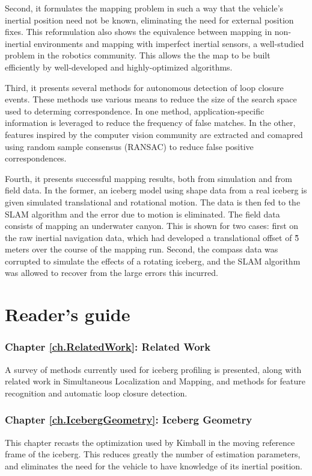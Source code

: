 Second, it formulates the mapping problem in such a way that the vehicle's inertial position need not be known, eliminating the need for external position fixes. This reformulation also shows the equivalence between mapping in non-inertial environments and mapping with imperfect inertial sensors, a well-studied problem in the robotics community. This allows the the map to be built efficiently by well-developed and highly-optimized algorithms.

Third, it presents several methods for autonomous detection of loop closure events. These methods use various means to reduce the size of the search space used to determing correspondence. In one method, application-specific information is leveraged to reduce the frequency of false matches. In the other, features inspired by the computer vision community are extracted and comapred using random sample consensus (RANSAC) to reduce  false positive correspondences.

Fourth, it presents successful mapping results, both from simulation and from field data. In the former, an iceberg model using shape data from a real iceberg is given simulated translational and rotational motion. The data is then fed to the SLAM algorithm and the error due to motion is eliminated. The field data consists of mapping an underwater canyon. This is shown for two cases: first on the raw inertial navigation data, which had developed a translational offset of \~ 5 meters over the course of the mapping run. Second, the compass data was corrupted to simulate the effects of a rotating iceberg, and the SLAM algorithm was allowed to recover from the large errors this incurred.

\section{Reader's guide}

\subsubsection*{Chapter \ref{ch.RelatedWork}: Related Work} A survey of methods currently used for iceberg profiling is presented, along with related work in Simultaneous Localization and Mapping, and methods for feature recognition and automatic loop closure detection.

\subsubsection*{Chapter \ref{ch.IcebergGeometry}: Iceberg Geometry}  This chapter recasts the optimization used by Kimball \cite{Kimball2011b} in the moving reference frame of the iceberg. This reduces greatly the number of estimation parameters, and eliminates the need for the vehicle to have knowledge of its inertial position.

